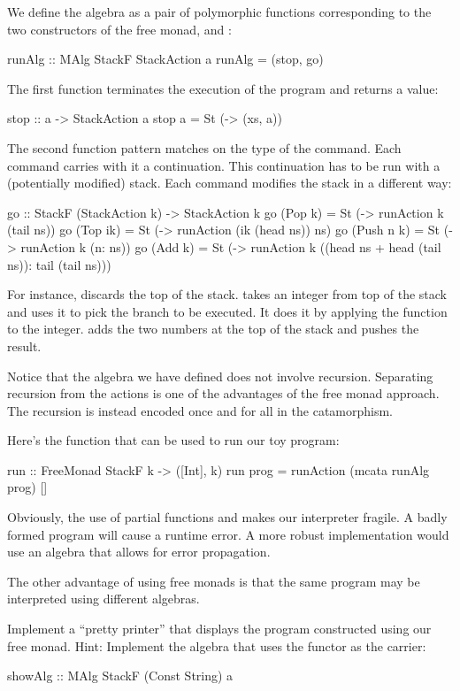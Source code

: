 \documentclass[DaoFP]{subfiles}
\begin{document}
We define the algebra as a pair of polymorphic functions corresponding to the two constructors of the free monad,  and :
\begin{haskell}
runAlg :: MAlg StackF StackAction a
runAlg = (stop, go)
\end{haskell}
The first function terminates the execution of the program and returns a value:
\begin{haskell}
stop :: a -> StackAction a
stop a = St (\xs -> (xs, a))
\end{haskell}
The second function pattern matches on the type of the command. Each command carries with it a continuation. This continuation has to be run with a (potentially modified) stack. Each command modifies the stack in a different way:
\begin{haskell}
go :: StackF (StackAction k) -> StackAction k
go (Pop k)    = St (\ns -> runAction k (tail ns))
go (Top ik)   = St (\ns -> runAction (ik (head ns)) ns)
go (Push n k) = St (\ns -> runAction k (n: ns))
go (Add k)    = St (\ns -> runAction k 
                   ((head ns + head (tail ns)): tail (tail ns)))
\end{haskell}
For instance,  discards the top of the stack.  takes an integer from top of the stack and uses it to pick the branch to be executed. It does it by applying the function  to the integer.  adds the two numbers at the top of the stack and pushes the result. 

Notice that the algebra we have defined does not involve recursion. Separating recursion from the actions is one of the advantages of the free monad approach. The recursion is instead encoded once and for all in the catamorphism. 

Here's the function that can be used to run our toy program:
\begin{haskell}
run :: FreeMonad StackF k -> ([Int], k)
run prog = runAction (mcata runAlg prog) [] 
\end{haskell}

Obviously, the use of partial functions  and  makes our interpreter fragile. A badly formed program will cause a runtime error. A more robust implementation would use an algebra that allows for error propagation.

The other advantage of using free monads is that the same program may be interpreted using different algebras.

\begin{exercise}
Implement a ``pretty printer'' that displays the program constructed using our free monad. Hint: Implement the algebra that uses the  functor as the carrier:
\begin{haskell}
showAlg :: MAlg StackF (Const String) a
\end{haskell}
\end{exercise}
\end{document}
